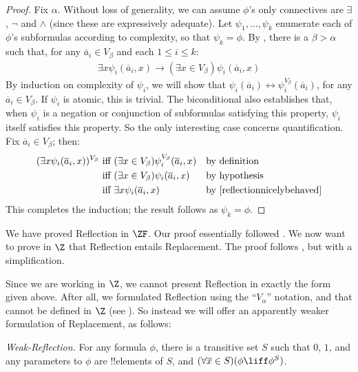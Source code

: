 \documentclass[../../../include/open-logic-section]{subfiles}
\begin{document}
\begin{proof}[Proof] 
Fix $\alpha$. Without loss of generality, we can assume $\phi$'s only
connectives are $\exists$, $\lnot$ and $\land$ (since these are
expressively adequate). Let $\psi_1, \ldots, \psi_k$ enumerate each of
$\phi$'s subformulas according to complexity, so that $\psi_k = \phi$.
By , there is a $\beta > \alpha$ such that, for
any $\overline{a}_i \in V_\beta$ and each $1 \leq i \leq k$:
\begin{align}\label{reflectionnicelybehaved}
	\exists x\psi_i(\overline{a}_i, x) \rightarrow 
	(\exists x \in V_\beta) \psi_i(\overline{a}_i, x)\tag{*}
\end{align}
By induction on complexity of $\psi_i$, we will show that
$\psi_i(\overline{a}_i) \leftrightarrow
\psi_i^{V_\beta}(\overline{a}_i)$, for any  $\overline{a}_i \in
V_\beta$. 	If $\psi_i$ is atomic, this is trivial. The biconditional
also establishes that, when $\psi_i$ is a negation or conjunction of
subformulas satisfying this property, $\psi_i$ itself satisfies this
property. So the only interesting case concerns quantification. Fix
$\overline{a}_i \in V_\beta$; then:
\begin{align*}
	(\exists x \psi_i(\overline{a}_i, x))^{V_\beta}
	&\text{ iff }
	(\exists x \in V_\beta)\psi_i^{V_\beta}(\overline{a}_i, x)
	&&\text{by definition}\\
	&\text{ iff }
	(\exists x \in V_\beta)\psi_i(\overline{a}_i,  x)
	&&\text{by hypothesis}\\
	&\text{ iff }
	\exists x \psi_i(\overline{a}_i, x)
	&&\text{by \eqref{reflectionnicelybehaved}}
\end{align*}
This completes the induction; the result follows as $\psi_k = \phi$.
\end{proof}

We have proved Reflection in $\ZF$. Our proof essentially
followed \citet{Montague1961}. We now want to prove in $\Z$ that
Reflection entails Replacement. The proof follows \citet{Levy1960},
but with a simplification. 

Since we are working in $\Z$, we cannot present Reflection in exactly
the form given above. After all, we formulated Reflection using the
``$V_\alpha$'' notation, and that cannot be defined in $\Z$ (see
). So instead we will offer an apparently
weaker formulation of Replacement, as follows:

\begin{defish}
\emph{Weak-Reflection.} For any formula $\phi$, there is a transitive
set $S$ such that $0$, $1$, and any parameters to $\phi$ are
!!{element}s of $S$, and $(\forall \overline{x} \in S)(\phi \liff
\phi^S)$.
\end{defish}
\end{document}
